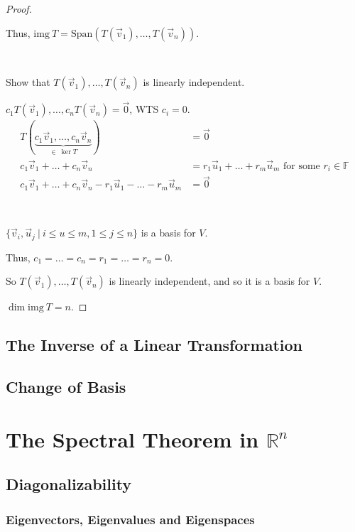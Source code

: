 \documentclass[11pt,fleqn]{book} %
\begin{document}
\begin{proof}
    {~~~}

    Thus, $\mathrm{img}~T = \mathrm{Span}\left( T(\vec{v}_1), \dots, T(\vec{v}_n) \right)$. 

    {~~~}

    Show that $T(\vec{v}_1), \dots, T(\vec{v}_n)$ is linearly independent. 
    
    $c_1 T(\vec{v}_1), \dots, c_nT(\vec{v}_n) = \vec{0}$, WTS $c_i = 0$. 
    \begin{align*}
        T ( \underbrace{c_1\vec{v}_1, \dots, c_n\vec{v}_n}_{\in~\ker T} ) 
        &= \vec{0}
        \\
        c_1\vec{v}_1 + \dots + c_n\vec{v}_n 
        &= r_1\vec{u}_1 + \dots + r_m\vec{u}_m \text{ for some } r_i \in \mathbb{F}
        \\
        c_1\vec{v}_1 + \dots + c_n\vec{v}_n - r_1\vec{u}_1 - \dots - r_m\vec{u}_m 
        &= \vec{0}
    \end{align*}
    
    {~~~}

    $\{\vec{v}_i, \vec{u}_j ~|~  i \le u \le m, 1 \le j \le n \}$ is a basis for $V$. 
    
    Thus, $c_1 = \dots = c_n = r_1 = \dots = r_n = 0$. 
    
    So $T(\vec{v}_1), \dots, T(\vec{v}_n)$ is linearly independent, and so it is a basis for $V$. 
    
    $\dim \mathrm{img}~T = n$. 
\end{proof}

\section{The Inverse of a Linear Transformation}

\section{Change of Basis}

\chapter{The Spectral Theorem in $\mathbb{R}^n$}

\section{Diagonalizability}

\subsection{Eigenvectors, Eigenvalues and Eigenspaces}
\end{document}

